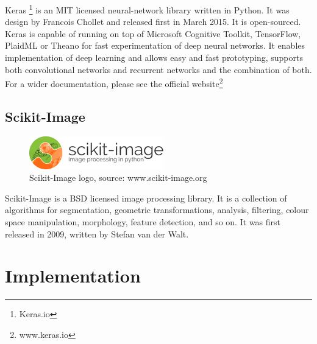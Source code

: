 Keras \footnote{Keras.io} is an MIT licensed neural-network library written in Python. It was design by Francois Chollet and released first in March 2015. It is open-sourced. Keras is capable of running on top of Microsoft Cognitive Toolkit, TensorFlow, PlaidML or Theano for fast experimentation of deep neural networks. It enables implementation of deep learning and allows easy and 
fast prototyping, supports both convolutional networks and recurrent networks and the combination of both. For a wider documentation, please see the official website\footnote{www.keras.io}

\subsection{ Scikit-Image}
\begin{figure}[H]
    \centering
    \includegraphics[width=0.7\linewidth]{images/Scikit-image.png}
     \caption{Scikit-Image logo, source: www.scikit-image.org}
  \end{figure}

Scikit-Image is a BSD licensed image processing library. It is a collection of algorithms for segmentation, 
geometric transformations, analysis, filtering, colour space manipulation, morphology, feature detection, and so on. It was first released in 2009, written by Stefan van der Walt.
\section{Implementation}
